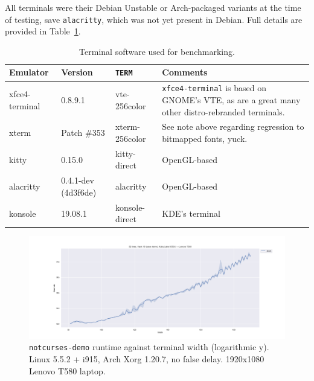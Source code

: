 All terminals were their Debian Unstable or Arch-packaged variants at the time
of testing, save \texttt{alacritty}, which was not yet present in Debian. Full
details are provided in Table~\ref{table:benchterms}.

\begin{table}
  \centering
  \begin{tabular}{|l|l|l|p{}|}
    \hline
    Emulator & Version & \texttt{TERM} & Comments \\
    \hline
    \hline
    xfce4-terminal & 0.8.9.1 & vte-256color & \texttt{xfce4-terminal} is based on GNOME's VTE\cite{gnomevte}, as are a great many other distro-rebranded terminals. \\
    \hline
    xterm & Patch \#353 & xterm-256color & See note above regarding regression to bitmapped fonts, yuck. \\
    \hline
    kitty & 0.15.0 & kitty-direct & OpenGL-based \\
    \hline
    alacritty & 0.4.1-dev (4d3f6de) & alacritty & OpenGL-based \\
    \hline
    konsole & 19.08.1 & konsole-direct & KDE's terminal \\
    \hline
  \end{tabular}
\caption{Terminal software used for benchmarking.}
\label{table:benchterms}
\end{table}

\begin{figure}[!htb]
\centering
\includegraphics[width=1\textwidth]{media/termsdemo.png}
\caption[Intel i7-8550U benchmarks, varying widths.]{\texttt{notcurses-demo} runtime against terminal width (logarithmic y). Linux 5.5.2 + i915, Arch Xorg 1.20.7, no false delay. 1920x1080 Lenovo T580 laptop.}
\label{fig:intel-full}
\end{figure}

